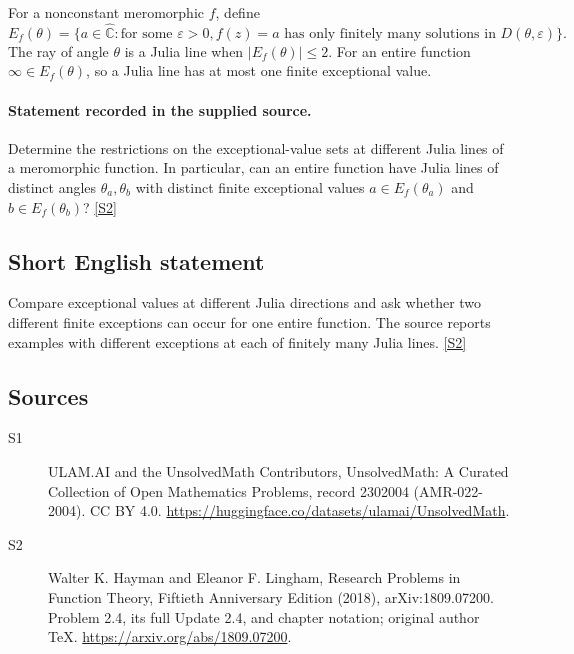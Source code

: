 \documentclass[11pt]{article}
\newcommand{\sref}[2]{\hyperlink{source:#1:#2}{[S#2]}}
\begin{document}
For a nonconstant meromorphic $f$, define
\[
 E_f(\theta)=\{a\in\widehat{\mathbb C}:\text{for some }\varepsilon>0,
                  f(z)=a\text{ has only finitely many solutions in }D(\theta,\varepsilon)\}.
\]
The ray of angle $\theta$ is a Julia line when $|E_f(\theta)|\le2$. For an entire function $\infty\in E_f(\theta)$, so a Julia line has at most one finite exceptional value.
\paragraph{Statement recorded in the supplied source.}
Determine the restrictions on the exceptional-value sets at different Julia lines of a meromorphic function. In particular, can an entire function have Julia lines of distinct angles $\theta_a,\theta_b$ with distinct finite exceptional values $a\in E_f(\theta_a)$ and $b\in E_f(\theta_b)$? \sref{2302004}{2}
\subsection{Short English statement}
Compare exceptional values at different Julia directions and ask whether two different finite exceptions can occur for one entire function. The source reports examples with different exceptions at each of finitely many Julia lines. \sref{2302004}{2}
\subsection{Sources}
\begin{description}
\item[\hypertarget{source:2302004:1}{S1}] ULAM.AI and the UnsolvedMath Contributors, UnsolvedMath: A Curated Collection of Open Mathematics Problems, record 2302004 (AMR-022-2004). CC BY 4.0. \url{https://huggingface.co/datasets/ulamai/UnsolvedMath}.
\item[\hypertarget{source:2302004:2}{S2}] Walter K. Hayman and Eleanor F. Lingham, Research Problems in Function Theory, Fiftieth Anniversary Edition (2018), arXiv:1809.07200. Problem 2.4, its full Update 2.4, and chapter notation; original author TeX. \url{https://arxiv.org/abs/1809.07200}.
\end{description}
\label{end:2302004}
\end{document}
